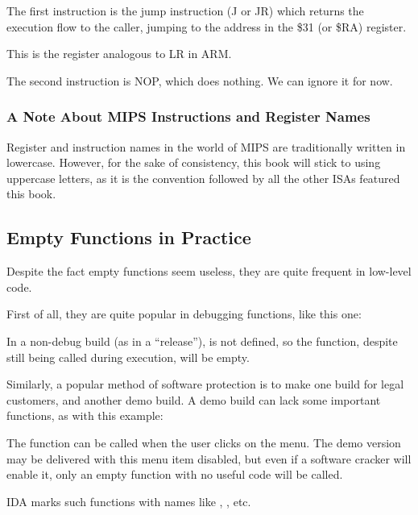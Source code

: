 The first instruction is the jump instruction (J or JR) which returns the execution flow to the \gls{caller},
jumping to the address in the \$31 (or \$RA) register.

This is the register analogous to \ac{LR} in ARM.

The second instruction is \ac{NOP}, which does nothing.
We can ignore it for now.

\subsubsection{A Note About MIPS Instructions and Register Names}

Register and instruction names in the world of MIPS are traditionally written in lowercase.
However, for the sake of consistency, this book will stick to using uppercase letters,
as it is the convention followed by all the other \ac{ISA}s featured this book.

\subsection{Empty Functions in Practice}

Despite the fact empty functions seem useless, they are quite frequent in low-level code.

First of all, they are quite popular in debugging functions, like this one:



In a non-debug build (as in a ``release''),  is not defined,
so the  function, despite still being called during execution,
will be empty.

Similarly, a popular method of software protection is to make one build for legal customers, and another demo build.
A demo build can lack some important functions, as with this example:



The  function can be called when the user clicks  on the menu.
The demo version may be delivered with this menu item disabled, but even if a software cracker will enable it,
only an empty function with no useful code will be called.

IDA marks such functions with names like , , etc.

